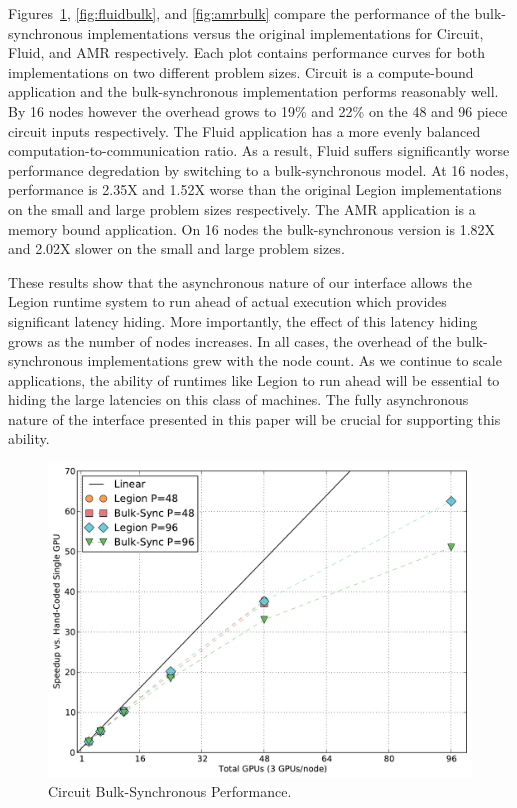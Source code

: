Figures~\ref{fig:cktbulk}, \ref{fig:fluidbulk}, and \ref{fig:amrbulk} compare
the performance of the bulk-synchronous implementations versus the original
implementations for Circuit, Fluid, and AMR respectively.  Each plot contains
performance curves for both implementations on two different problem sizes.
Circuit is a compute-bound application and the bulk-synchronous implementation
performs reasonably well.  By 16 nodes however the overhead grows to 19\%
and 22\% on the 48 and 96 piece circuit inputs respectively.  The Fluid application 
has a more evenly balanced computation-to-communication ratio.  As a result,
Fluid suffers significantly worse performance degredation by switching to
a bulk-synchronous model.  At 16 nodes, performance is 2.35X and 1.52X worse
than the original Legion implementations on the small and large problem sizes
respectively.  The AMR application is a memory bound application.  On 16 nodes
the bulk-synchronous version is 1.82X and 2.02X slower on the small and
large problem sizes.

These results show that the asynchronous nature of our interface allows
the Legion runtime system to run ahead of actual execution which
provides significant latency hiding.  More
importantly, the effect of this latency hiding grows as the number of
nodes increases.  In all cases, the overhead of the bulk-synchronous
implementations grew with the node count.  As we continue to scale
applications, the ability of runtimes like Legion to run ahead
will be essential to hiding the large latencies on this class of machines.
The fully asynchronous nature of the interface presented in this paper
will be crucial for supporting this ability.


\begin{figure}
\begin{center}
\includegraphics[scale=0.33]{figs/circuit_bulk_sync.pdf}
\end{center}
\vspace{-6mm}
\caption{Circuit Bulk-Synchronous Performance.\label{fig:cktbulk}}
\vspace{-4mm}
\end{figure}

